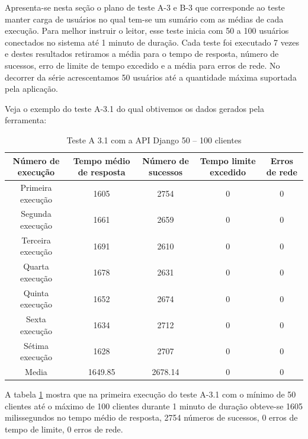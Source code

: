     
  Apresenta-se nesta seção o plano de teste A-3 e B-3 que corresponde ao teste manter carga de usuários no qual tem-se um sumário
  com as médias de cada execução.
  Para melhor instruir o leitor, esse teste inicia com 50 a 100 usuários conectados no sistema até 1 minuto de duração. Cada teste
  foi executado 7 vezes e destes resultados retiramos a média para o tempo de resposta, número de sucessos, erro de limite de tempo excedido
  e a média para erros de rede. No decorrer da série acrescentamos 50 usuários até a quantidade máxima suportada pela aplicação.
  
  Veja o exemplo do teste A-3.1 do qual obtivemos os dados gerados pela ferramenta:
  
  \begin{table}[H]
    \centering
    \footnotesize
    \setlength{\abovecaptionskip}{0pt}
    \setlength{\belowcaptionskip}{0pt}
    \caption[Teste A-3.1 com a API Django 50 – 100 clientes]{Teste A 3.1 com a API Django 50 – 100 clientes}
    \label{tab:teste-a-3-1}
    \begin{tabular}{c|c|c|c|c}
      \hline \hline
      Número de execução &	Tempo médio de resposta &	Número de sucessos &	Tempo limite excedido &	 Erros de rede \\
      \hline \hline
      Primeira execução &	1605 &				2754 &			0 &				0 \\
      Segunda execução &	1661 &				2659 &			0 &				0 \\
      Terceira execução &	1691 &				2610 &			0 &				0 \\
      Quarta execução  &	1678 &				2631 &			0 &				0 \\
      Quinta execução  &	1652 &				2674 &			0 &				0 \\
      Sexta execução   &	1634 &				2712 &			0 &				0 \\
      Sétima execução  &	1628 &				2707 &			0 &				0 \\
      Media & 			1649.85 &			2678.14 & 		0 &				0 \\
      \hline \hline
    \end{tabular}
  \end{table}
  
  A tabela \ref{tab:teste-a-3-1} mostra que na primeira execução do teste A-3.1 com o mínimo de 50 clientes até o máximo de 100 clientes
  durante 1 minuto de duração obteve-se 1605 milissegundos no tempo médio de resposta,
  2754 números de sucessos, 0 erros de tempo de limite, 0 erros de rede.
  
